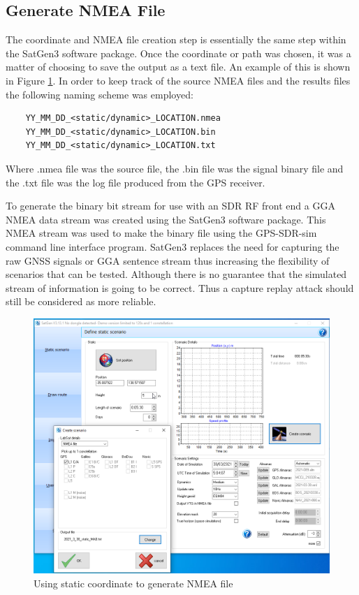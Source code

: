 \subsection{Generate NMEA File} \label{subsec:NMEAFile}
The coordinate and NMEA file creation step is essentially the same step within the SatGen3 software package. Once the coordinate or path was chosen, it was a matter of
choosing to save the output as a text file. An example of this is shown in Figure \ref{fig:StaticCoordinateNMEA}. In order to keep track of the source NMEA files and the
results files the following naming scheme was employed:

\begin{verbatim}
    YY_MM_DD_<static/dynamic>_LOCATION.nmea
    YY_MM_DD_<static/dynamic>_LOCATION.bin
    YY_MM_DD_<static/dynamic>_LOCATION.txt
\end{verbatim}

Where .nmea file was the source file, the .bin file was the signal binary file and the .txt file was the log file produced from the GPS receiver.

To generate the binary bit stream for use with an SDR RF front end a GGA NMEA data stream was created using the SatGen3 software package. This NMEA stream was used to make
the binary file using the GPS-SDR-sim command line interface program. SatGen3 replaces the need for capturing the raw GNSS signals or GGA sentence stream thus increasing
the flexibility of scenarios that can be tested. Although there is no guarantee that the simulated stream of information is going to be correct. Thus a capture replay
attack should still be considered as more reliable.

\begin{figure}[!ht]
    \begin{centering}
        \includegraphics[width=12cm,keepaspectratio]{Figures/2021_03_30_static_MAB_setup.png}
        \caption{Using static coordinate to generate NMEA file}
    \label{fig:StaticCoordinateNMEA}
    \end{centering}
\end{figure}

